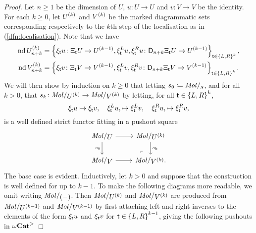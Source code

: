 \begin{proof}
    Let \( n \geq 1 \) be the dimension of \( U \), \( u \colon U \to U \) and \( v \colon V \to V \) be the identity.
    For each \( k \geq 0 \), let \( \order{k}{U} \) and \( \order{k}{V} \) be the marked diagrammatic sets corresponding respectively to the \( k \)\nbd th step of the localisation as in (\ref{dfn:localisation}).
    Note that we have
    \begin{align*}
        \nd \gr{n + k}{\order{k}{U}} &= \set{\hinv{\s}u \colon \hcyl{\s} U \to \order{k - 1}{U}, \hinv{\s}^Lu, \hinv{\s}^Ru \colon \dual{n + k}{\hcyl{\s} U} \to \order{k - 1}{U}}_{\s \in \set{L, R}^k},\\
        \nd \gr{n + k}{\order{k}{V}} &= \set{\hinv{\s}v \colon \hcyl{\s} V \to \order{k - 1}{V}, \hinv{\s}^Lv, \hinv{\s}^Rv \colon \dual{n + k}{\hcyl{\s} V} \to \order{k - 1}{V}}_{\s \in \set{L, R}^k}.
    \end{align*}
    We will then show by induction on \( k \geq 0 \) that letting \( s_0 \eqdef \molecin{s} \), and for all \( k > 0 \), that \( s_k \colon \molecin{\order{k}{U}} \to \molecin{\order{k}{V}} \) by letting, for all \( \s \in \set{L, R}^k \),
    \begin{equation*}
        \hinv{\s}u \mapsto \hinv{\s}v,\quad \hinv{\s}^Lu, \mapsto \hinv{\s}^Lv,\quad \hinv{\s}^Ru, \mapsto \hinv{\s}^Rv,
    \end{equation*}
    is a well defined strict functor fitting in a pushout square
    \begin{equation} \label{tik:inductive_square_subdivision_localisation}
        \begin{tikzcd}
            {\molecin U} & {\molecin{\order k U}} \\
            {\molecin V} & {\molecin {\order k V}.}
            \arrow[""{name=0, anchor=center, inner sep=0}, from=1-1, to=1-2]
            \arrow["{s_0}"', from=1-1, to=2-1]
            \arrow["{s_k}", from=1-2, to=2-2]
            \arrow[from=2-1, to=2-2]
            \arrow["\lrcorner"{anchor=center, pos=0.125, rotate=180}, draw=none, from=2-2, to=0]
        \end{tikzcd}
    \end{equation}
    The base case is evident.
    Inductively, let \( k > 0 \) and suppose that the construction is well defined for up to \( k - 1 \).
    To make the following diagrams more readable, we omit writing \( \molecin{(-)} \).
    Then \( {\molecin{\order k U}} \) and \( {\molecin{\order k V}} \) are produced from \( {\molecin{\order {k - 1} U}} \) and \( {\molecin{\order {k - 1} V}} \) by first attaching left and right inverses to the elements of the form \( \hinv{\s}u \) and \( \hinv{\s}v \) for \( \s \in \set{L, R}^{k - 1} \), giving the following pushouts in \( \somegaCat \)

\end{proof}
